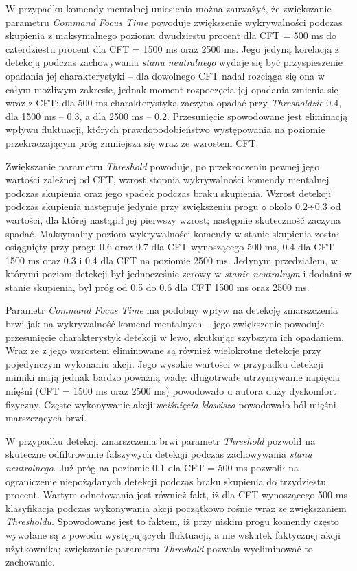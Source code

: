 \documentclass[skorowidz,skroty]{dyplomWEZUT}
\begin{document}
W przypadku komendy mentalnej uniesienia można zauważyć, że zwiększanie parametru \textit{Command Focus Time} powoduje zwiększenie wykrywalności podczas skupienia z maksymalnego poziomu dwudziestu procent dla CFT = 500 ms do czterdziestu procent dla CFT = 1500 ms oraz 2500 ms. Jego jedyną korelacją z detekcją podczas zachowywania \textit{stanu neutralnego} wydaje się być przyspieszenie opadania jej charakterystyki -- dla dowolnego CFT nadal rozciąga się ona w całym możliwym zakresie, jednak moment rozpoczęcia jej opadania zmienia się wraz z CFT: dla 500 ms charakterystyka zaczyna opadać przy \textit{Thresholdzie} 0.4, dla 1500 ms -- 0.3, a dla 2500 ms -- 0.2. Przesunięcie spowodowane jest eliminacją wpływu fluktuacji, których prawdopodobieństwo występowania na poziomie przekraczającym próg zmniejsza się wraz ze wzrostem CFT.

Zwiększanie parametru \textit{Threshold} powoduje, po przekroczeniu pewnej jego wartości zależnej od CFT, wzrost stopnia wykrywalności komendy mentalnej podczas skupienia oraz jego spadek podczas braku skupienia. Wzrost detekcji podczas skupienia następuje jedynie przy zwiększeniu progu o około 0.2÷0.3 od wartości, dla której nastąpił jej pierwszy wzrost; następnie skuteczność zaczyna spadać. Maksymalny poziom wykrywalności komendy w stanie skupienia został osiągnięty przy progu 0.6 oraz 0.7 dla CFT wynoszącego 500 ms, 0.4 dla CFT 1500 ms oraz 0.3 i 0.4 dla CFT na poziomie 2500 ms. Jedynym przedziałem, w którymi poziom detekcji był jednocześnie zerowy w \textit{stanie neutralnym} i dodatni w stanie skupienia, był próg od 0.5 do 0.6 dla CFT 1500 ms oraz 2500 ms.

Parametr \textit{Command Focus Time} ma podobny wpływ na detekcję zmarszczenia brwi jak na wykrywalność komend mentalnych -- jego zwiększenie powoduje przesunięcie charakterystyk detekcji w lewo, skutkując szybszym ich opadaniem. Wraz ze z jego wzrostem eliminowane są również wielokrotne detekcje przy pojedynczym wykonaniu akcji. Jego wysokie wartości w przypadku detekcji mimiki mają jednak bardzo poważną wadę: długotrwałe utrzymywanie napięcia mięśni (CFT = 1500 ms oraz 2500 ms) powodowało u autora duży dyskomfort fizyczny. Częste wykonywanie akcji \textit{wciśnięcia klawisza} powodowało ból mięśni marszczących brwi.

W przypadku detekcji zmarszczenia brwi parametr \textit{Threshold} pozwolił na skuteczne odfiltrowanie fałszywych detekcji podczas zachowywania \textit{stanu neutralnego}. Już próg na poziomie 0.1 dla CFT = 500 ms pozwolił na ograniczenie niepożądanych detekcji podczas braku skupienia do trzydziestu procent. Wartym odnotowania jest również fakt, iż dla CFT wynoszącego 500 ms klasyfikacja podczas wykonywania akcji początkowo rośnie wraz ze zwiększaniem \textit{Thresholdu}. Spowodowane jest to faktem, iż przy niskim progu komendy często wywołane są z powodu występujących fluktuacji, a nie wskutek faktycznej akcji użytkownika; zwiększanie parametru \textit{Threshold} pozwala wyeliminować to zachowanie.
\end{document}
